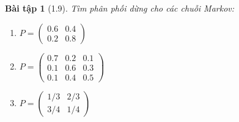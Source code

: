 \documentclass[8pt,a4paper]{article}
\newtheorem{exercise}{Bài tập}
\begin{document}
\begin{exercise}[1.9]
Tìm phân phối dừng cho các chuỗi Markov:
\begin{enumerate}[label=(\alph*)]
\item $P = \begin{pmatrix} 0.6 & 0.4 \\ 0.2 & 0.8 \end{pmatrix}$
\item $P = \begin{pmatrix} 0.7 & 0.2 & 0.1 \\ 0.1 & 0.6 & 0.3 \\ 0.1 & 0.4 & 0.5 \end{pmatrix}$
\item $P = \begin{pmatrix} 1/3 & 2/3 \\ 3/4 & 1/4 \end{pmatrix}$
\end{enumerate}
\end{exercise}
\end{document}
